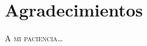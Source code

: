 \begingroup
\pagestyle{empty} %

\chapter*{Agradecimientos}

\textsc{A mi paciencia}\ldots


\thispagestyle{empty}
\cleardoublepage
\endgroup